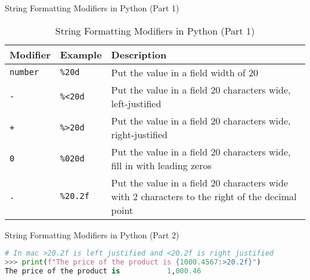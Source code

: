 \begin{frame}{String Formatting Modifiers in Python (Part 1)}
    \begin{table}[]
        \centering
        \begin{tabular}{|l|l|p{6cm}|}
            \hline
            \textbf{Modifier} & \textbf{Example} & \textbf{Description} \\ \hline
            \texttt{number} & \texttt{\%20d} & Put the value in a field width of 20 \\ \hline
            \texttt{-} & \texttt{\%<20d} & Put the value in a field 20 characters wide, left-justified \\ \hline
            \texttt{+} & \texttt{\%>20d} & Put the value in a field 20 characters wide, right-justified \\ \hline
            \texttt{0} & \texttt{\%020d} & Put the value in a field 20 characters wide, fill in with leading zeros \\ \hline
            \texttt{.} & \texttt{\%20.2f} & Put the value in a field 20 characters wide with 2 characters to the right of the decimal point \\ \hline
        \end{tabular}
        \caption{String Formatting Modifiers in Python (Part 1)}
    \end{table}
\end{frame}

\begin{frame}[fragile]{String Formatting Modifiers in Python (Part 2)}
    \begin{lstlisting}[style=colorful, language=Python]
# In mac >20.2f is left justified and <20.2f is right justified
>>> print(f"The price of the product is {1000.4567:>20.2f}") 
The price of the product is           1,000.46
    \end{lstlisting}
\end{frame}
